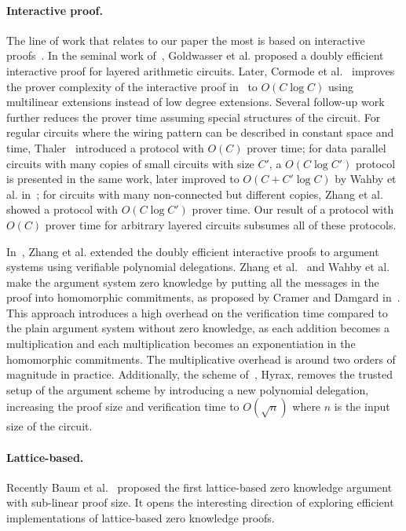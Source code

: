 \paragraph{Interactive proof.} The line of work that relates to our paper the most is based on interactive proofs~\cite{goldwasser1989knowledge}. In the seminal work of~\cite{GKR}, Goldwasser et al. proposed a doubly efficient interactive proof for layered arithmetic circuits. Later, Cormode et al.~\cite{CMT} improves the prover complexity of the interactive proof in~\cite{GKR} to $O(C\log C)$ using multilinear extensions instead of low degree extensions. Several follow-up work further reduces the prover time assuming special structures of the circuit. For regular circuits where the wiring pattern can be described in constant space and time, Thaler~\cite{t13} introduced a protocol with $O(C)$ prover time; for data parallel circuits with many copies of small circuits with size $C'$, a $O(C\log C')$ protocol is presented in the same work, later improved to $O(C+C'\log C)$ by Wahby et al. in~\cite{wahby2017full}; for circuits with many non-connected but different copies, Zhang et al. showed a protocol with $O(C\log C')$ prover time. Our result of a protocol with $O(C)$ prover time for arbitrary layered circuits subsumes all of these protocols. 

In~\cite{zhang2017vsql}, Zhang et al. extended the doubly efficient interactive proofs to argument systems using verifiable polynomial delegations. Zhang et al.~\cite{vram} and Wahby et al.~\cite{hyrax} make the argument system zero knowledge by putting all the messages in the proof into homomorphic commitments, as proposed by Cramer and Damgard in~\cite{cramer1998zero}. This approach introduces a high overhead on the verification time compared to the plain argument system without zero knowledge, as each addition becomes a multiplication and each multiplication becomes an exponentiation in the homomorphic commitments. The multiplicative overhead is around two orders of magnitude in practice. Additionally, the scheme of~\cite{hyrax}, Hyrax, removes the trusted setup of the argument scheme by introducing a new polynomial delegation, increasing the proof size and verification time to $O(\sqrt{n})$ where $n$ is the input size of the circuit. 

\paragraph{Lattice-based.} Recently Baum et al.~\cite{baum2018sub} proposed the first lattice-based zero knowledge argument with sub-linear proof size. It opens the interesting direction of exploring efficient implementations of lattice-based zero knowledge proofs.